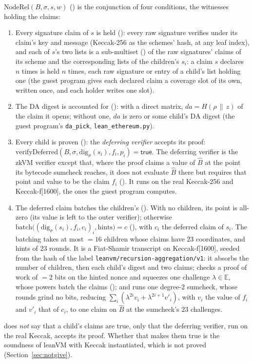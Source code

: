 \documentclass[11pt]{article}
\begin{document}
$\mathrm{NodeRel}(B, \sigma, s, w)$ () is the conjunction of four conditions,
the witnesses holding the claims:
\begin{enumerate}
\item Every signature claim of $s$ is held (): every raw signature verifies
under its claim's key and message (Keccak-256 as the schemes' hash, at any leaf index), and each
of $s$'s two lists is a sub-multiset () of the raw signatures' claims of its scheme and the corresponding lists of the children's $s_i$: a claim $s$ declares $n$ times is held $n$ times, each raw signature or entry of a child's list holding one (the guest program gives each declared claim a coverage slot of its own, written once, and each holder writes one slot).
\item The DA digest is accounted for (): with a direct matrix,
$\mathit{da} = H(\rho \,\|\, z)$ of the claim it opens; without one, $\mathit{da}$ is zero or
some child's DA digest (the guest program's \texttt{da\_pick}, \texttt{lean\_ethereum.py}).
\item Every child is proven (): the \emph{deferring verifier} accepts its proof: $\mathrm{verifyDeferred}(B, \sigma,
\mathrm{dig}_\sigma(s_i), f_i, p_i) = \mathsf{true}$. The deferring verifier is the zkVM verifier
except that, where the proof claims a value of $\widehat{B}$ at the point its bytecode sumcheck
reaches, it does not evaluate $\widehat{B}$ there but requires that point and value to be the claim
$f_i$ (). It runs on the real Keccak-256 and Keccak-f[1600], the ones the guest program
computes.
\item The deferred claim batches the children's (). With no children, its point is all-zero (its value is left to the outer verifier); otherwise $\mathrm{batch}\big((\mathrm{dig}_\sigma(s_i), f_i, c_i)_i, \text{hints}\big) = c$ (), with $c_i$ the deferred claim of $s_i$. The batching takes at most  $= 16$ children whose claims have $23$ coordinates, and hints of $23$ rounds. It is a Fiat-Shamir transcript on Keccak-f[1600], seeded from the hash of the label \texttt{leanvm/recursion-aggregation/v1}: it absorbs the number of children, then each child's digest and two claims; checks a proof of work of  $= 2$ bits on the hinted nonce and squeezes one challenge $\lambda \in \mathbb{E}$, whose powers batch the claims (); and runs one degree-$2$ sumcheck, whose rounds grind no bits, reducing $\sum_i (\lambda^{2i} v_i + \lambda^{2i+1} v'_i)$, with $v_i$ the value of $f_i$ and $v'_i$ that of $c_i$, to one claim on $\widehat{B}$ at the sumcheck's $23$ challenges.
\end{enumerate}
 does \emph{not} say that a child's claims are true, only that the deferring verifier,
run on the real Keccak, accepts its proof. Whether that makes them true is the soundness of leanVM
with Keccak instantiated, which is not proved (Section~\ref{sec:notgive}).
\end{document}
